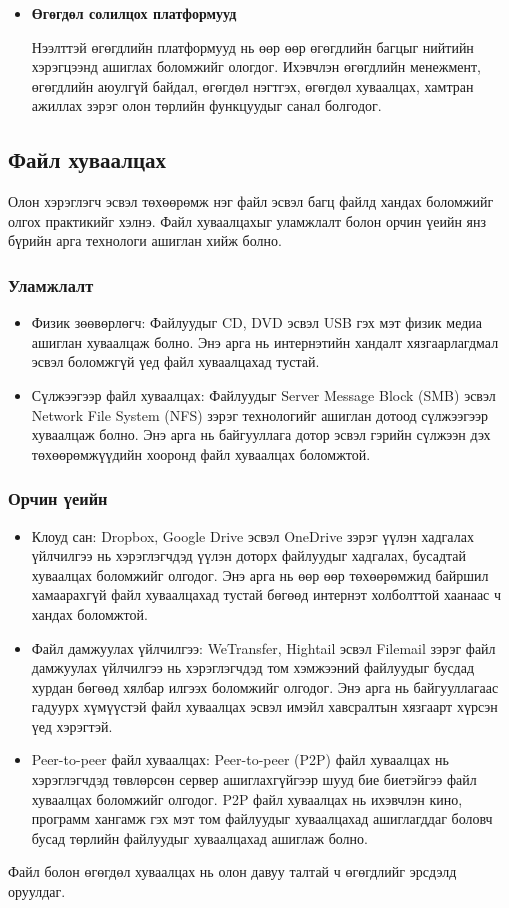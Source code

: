 \begin{itemize}
    \item \textbf{Өгөгдөл солилцох платформууд}

          Нээлттэй өгөгдлийн платформууд нь өөр өөр өгөгдлийн багцыг нийтийн хэрэгцээнд ашиглах боломжийг ологдог. Ихэвчлэн өгөгдлийн менежмент, өгөгдлийн аюулгүй байдал, өгөгдөл нэгтгэх, өгөгдөл хуваалцах, хамтран ажиллах зэрэг олон төрлийн функцуудыг санал болгодог.

\end{itemize}

\subsection*{Файл хуваалцах}
Олон хэрэглэгч эсвэл төхөөрөмж нэг файл эсвэл багц файлд хандах боломжийг олгох практикийг хэлнэ. Файл хуваалцахыг уламжлалт болон орчин үеийн янз бүрийн арга технологи ашиглан хийж болно.\cite{WikiFileSharing}

\subsubsection*{Уламжлалт}
\begin{itemize}
    \item Физик зөөвөрлөгч: Файлуудыг CD, DVD эсвэл USB гэх мэт физик медиа ашиглан хуваалцаж болно. Энэ арга нь интернэтийн хандалт хязгаарлагдмал эсвэл боломжгүй үед файл хуваалцахад тустай.
    \item Сүлжээгээр файл хуваалцах: Файлуудыг Server Message Block (SMB) эсвэл Network File System (NFS) зэрэг технологийг ашиглан дотоод сүлжээгээр хуваалцаж болно. Энэ арга нь байгууллага дотор эсвэл гэрийн сүлжээн дэх төхөөрөмжүүдийн хооронд файл хуваалцах боломжтой.
\end{itemize}

\subsubsection*{Орчин үеийн}
\begin{itemize}
    \item Клоуд сан: Dropbox, Google Drive эсвэл OneDrive зэрэг үүлэн хадгалах үйлчилгээ нь хэрэглэгчдэд үүлэн доторх файлуудыг хадгалах, бусадтай хуваалцах боломжийг олгодог. Энэ арга нь өөр өөр төхөөрөмжид байршил хамаарахгүй файл хуваалцахад тустай бөгөөд интернэт холболттой хаанаас ч хандах боломжтой.
    \item Файл дамжуулах үйлчилгээ: WeTransfer, Hightail эсвэл Filemail зэрэг файл дамжуулах үйлчилгээ нь хэрэглэгчдэд том хэмжээний файлуудыг бусдад хурдан бөгөөд хялбар илгээх боломжийг олгодог. Энэ арга нь байгууллагаас гадуурх хүмүүстэй файл хуваалцах эсвэл имэйл хавсралтын хязгаарт хүрсэн үед хэрэгтэй.
    \item Peer-to-peer файл хуваалцах: Peer-to-peer (P2P) файл хуваалцах нь хэрэглэгчдэд төвлөрсөн сервер ашиглахгүйгээр шууд бие биетэйгээ файл хуваалцах боломжийг олгодог. P2P файл хуваалцах нь ихэвчлэн кино, программ хангамж гэх мэт том файлуудыг хуваалцахад ашиглагддаг боловч бусад төрлийн файлуудыг хуваалцахад ашиглаж болно.
\end{itemize}
Файл болон өгөгдөл хуваалцах нь олон давуу талтай ч өгөгдлийг эрсдэлд оруулдаг.

